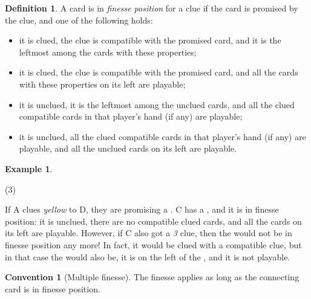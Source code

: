 \documentclass[a4paper]{article}
\theoremstyle{plain}
\theoremstyle{definition}
\newtheorem{definition}[theorem]{Definition}
\newtheorem{example}[theorem]{Example}
\newtheorem{convention}[theorem]{Convention}
\begin{document}
\begin{definition}
	\label{def:finesse-position}
	A card is in \emph{finesse position} for a clue if the card is promised by the clue, and one of the following holds:
	
	\begin{itemize}
		\item it is clued, the clue is compatible with the promised card, and it is the leftmost among the cards with these properties;
		\item it is clued, the clue is compatible with the promised card, and all the cards with these properties on its left are playable;
		\item it is unclued, it is the leftmost among the unclued cards, and all the clued compatible cards in that player's hand (if any) are playable;
		\item it is unclued, all the clued compatible cards in that player's hand (if any) are playable, and all the unclued cards on its left are playable.
	\end{itemize}
\end{definition}

\begin{example}
	\hfill
	\begin{tasks}(3)
		\task[+]      
		\task[A]    
		\task[B]    
		\task[C]    
		\task[D]    
		\task[E]    
	\end{tasks}
	
	If A clues \textit{yellow} to D, they are promising a . C has a , and it is in finesse position: it is unclued, there are no compatible clued cards, and all the cards on its left are playable. However, if C also got a \textit{3} clue, then the  would not be in finesse position any more! In fact, it would be clued with a compatible clue, but in that case the  would also be, it is on the left of the , and it is not playable.
\end{example}

\begin{convention}[Multiple finesse]
	\label{multiple-finesse}
	The finesse applies as long as the connecting card is in finesse position.
\end{convention}
\end{document}
